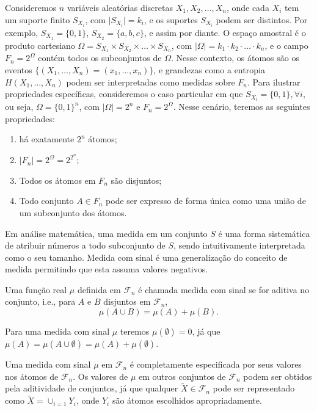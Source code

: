 Consideremos $n$ variáveis aleatórias discretas $X_1, X_2, \ldots, X_n$,
onde cada $X_i$ tem um suporte finito $S_{X_i}$, com $\vert S_{X_i} \vert = k_i$,
e os suportes $S_{X_i}$ podem ser distintos.
Por exemplo, $S_{X_1} = \{0,1\}$, $S_{X_2} = \{a,b,c\}$, e assim por diante. 
O espaço amostral é o produto cartesiano $\Omega = S_{X_1} \times S_{X_2} \times \ldots \times S_{X_n}$,
com $\vert \Omega \vert = k_1 \cdot k_2 \cdot \ldots \cdot k_n$, e o campo $F_n = 2^{\Omega}$
contém todos os subconjuntos de $\Omega$. Nesse contexto, os átomos são os eventos
$\{(X_1, \ldots, X_n) = (x_1, \ldots, x_n)\}$, e grandezas como a entropia $H(X_1,\ldots,X_n)$
podem ser interpretadas como medidas sobre $F_n$.
Para ilustrar propriedades específicas, consideremos o caso particular em que $S_{X_i} = \{0,1\}, \forall i$,
ou seja, $\Omega = \{0,1\}^n$, com $\vert \Omega \vert = 2^n$ e $F_n = 2^\Omega$.
Nesse cenário, teremos as seguintes propriedades:
\begin{enumerate}
  \item há exatamente $2^n$ átomos;
  \item $\vert F_n \vert = 2^\Omega = 2^{2^n}$;
  \item Todos os átomos em $F_n$ são disjuntos;
  \item Todo conjunto $A \in F_n$ pode ser expresso de forma única como uma união de um subconjunto dos átomos.
\end{enumerate}

Em análise matemática, uma medida em um conjunto $S$ é uma forma sistemática de atribuir
números a todo subconjunto de $S$, sendo intuitivamente interpretada como o seu tamanho.
Medida com sinal é uma generalização do conceito de medida permitindo que esta assuma valores
negativos.

\begin{definition}
  Uma função real $\mu$ definida em $\mathcal{F}_n$ é chamada medida com sinal se
  for aditiva no conjunto, i.e., para $A$ e $B$ disjuntos em $\mathcal{F}_n$,
  \begin{equation}
  \mu(A \cup B) = \mu(A) + \mu(B) .
  \end{equation}
\end{definition}
Para uma medida com sinal $\mu$ teremos $\mu(\emptyset)=0$, já que
$\mu(A) = \mu(A \cup \emptyset) = \mu(A) + \mu(\emptyset)$.

Uma medida com sinal $\mu$ em $\mathcal{F}_n$ é completamente especificada
por seus valores nos átomos de $\mathcal{F}_n$. Os valores de $\mu$ em outros
conjuntos de $\mathcal{F}_n$ podem ser obtidos pela aditividade de conjuntos,
já que qualquer $\tilde{X} \in \mathcal{F}_n$ pode ser representado como
$\tilde{X} = \cup_{i=1} Y_i$, onde $Y_i$ são átomos escolhidos apropriadamente.

